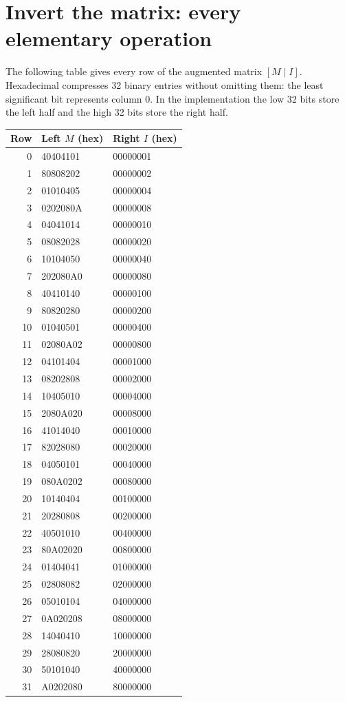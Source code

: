 \section{Invert the matrix: every elementary operation}
The following table gives every row of the augmented matrix $[M\mid I]$. Hexadecimal compresses 32 binary entries without omitting them: the least significant bit represents column 0. In the implementation the low 32 bits store the left half and the high 32 bits store the right half.
\begingroup\small
\begin{longtable}{rll}
\toprule
Row & Left $M$ (hex) & Right $I$ (hex)\\\midrule
\endhead
0 & 40404101 & 00000001\\
1 & 80808202 & 00000002\\
2 & 01010405 & 00000004\\
3 & 0202080A & 00000008\\
4 & 04041014 & 00000010\\
5 & 08082028 & 00000020\\
6 & 10104050 & 00000040\\
7 & 202080A0 & 00000080\\
8 & 40410140 & 00000100\\
9 & 80820280 & 00000200\\
10 & 01040501 & 00000400\\
11 & 02080A02 & 00000800\\
12 & 04101404 & 00001000\\
13 & 08202808 & 00002000\\
14 & 10405010 & 00004000\\
15 & 2080A020 & 00008000\\
16 & 41014040 & 00010000\\
17 & 82028080 & 00020000\\
18 & 04050101 & 00040000\\
19 & 080A0202 & 00080000\\
20 & 10140404 & 00100000\\
21 & 20280808 & 00200000\\
22 & 40501010 & 00400000\\
23 & 80A02020 & 00800000\\
24 & 01404041 & 01000000\\
25 & 02808082 & 02000000\\
26 & 05010104 & 04000000\\
27 & 0A020208 & 08000000\\
28 & 14040410 & 10000000\\
29 & 28080820 & 20000000\\
30 & 50101040 & 40000000\\
31 & A0202080 & 80000000\\
\bottomrule\end{longtable}
